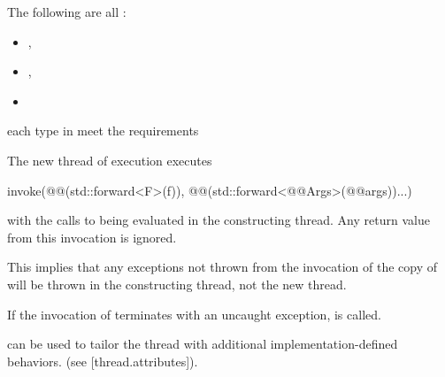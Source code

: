 \documentclass{wg21}
\begin{document}
\begin{itemdescr}
\pnum
\mandates
The following are all :
\begin{itemize}
    \item {},
    \item {}, 
    \item {}
\end{itemize}

\pnum
\expects
{} each type in  meet the
 requirements

\pnum
\effects
The new thread of execution executes
\begin{codeblock}
    invoke(@@(std::forward<F>(f)), @@(std::forward<@@Args>(@@args))...)
\end{codeblock}
with the calls to
 being evaluated in the constructing thread.
Any return value from this invocation is ignored.
\begin{note}
    This implies that any exceptions not thrown from the invocation of the copy
    of  will be thrown in the constructing thread, not the new thread.
\end{note}
If the invocation of  terminates with an uncaught exception,
 is called.

\begin{addedblock}
 can be used to tailor the thread with additional implementation-defined behaviors. (see [thread.attributes]).
\end{addedblock}


\end{itemdescr}
\end{document}

